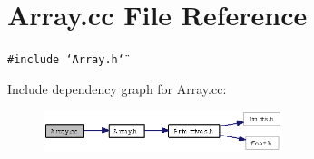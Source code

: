\section{Array.cc File Reference}
\label{Array_8cc}
{\tt \#include \char`\"{}Array.h\char`\"{}}\par


Include dependency graph for Array.cc:\begin{figure}[H]
\begin{center}
\leavevmode
\includegraphics[width=197pt]{Array_8cc__incl}
\end{center}
\end{figure}
